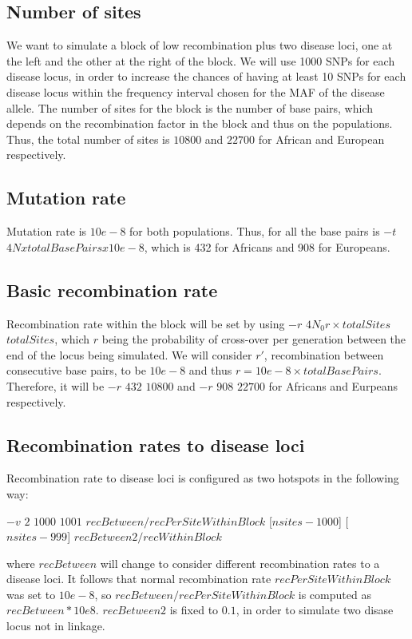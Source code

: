 \documentclass[runningheads]{/home/mabad/conferences/LNCS/llncs}
\begin{document}
\subsection{Number of sites}
We want to simulate a block of low recombination plus two disease loci, one at the left and the other at the right of the block. 
We will use 1000 SNPs for each disease locus, in order to increase the chances of having at least 10 SNPs for each disease locus within the frequency interval chosen for the MAF of the disease allele.
The number of sites for the block is the number of base pairs, which depends on the recombination factor in the block and thus on the populations. Thus, the total number of sites is $10800$ and $22700$ for African and European respectively. 

\subsection{Mutation rate}

Mutation rate is $10e-8$ for both populations. Thus, for all the base pairs is $-t$ $4NxtotalBasePairsx10e-8$, which is  432 for Africans and 908 for Europeans. 

\subsection{Basic recombination rate}
Recombination rate within the block will be set by using $-r$ $4N_0r\times totalSites$ $totalSites$, which $r$ being the probability of cross-over per generation between the end of the locus being simulated. We will consider $r'$, recombination between consecutive base pairs, to be $10e-8$ and thus $r=10e-8 \times totalBasePairs$. Therefore, it will be $-r$  $432$ $10800$ and $-r$ $908$ $22700$ for Africans and Eurpeans respectively.

\subsection{Recombination rates to disease loci}
Recombination rate to disease loci is configured as two hotspots in the following
way:

$-v$ $2$  $1000$ $1001$ $recBetween/recPerSiteWithinBlock$ [$nsites-1000$] [$nsites-999$] $recBetween2/recWithinBlock$


where $recBetween$ will change to consider different recombination rates to a disease loci. 
It follows that normal recombination rate $recPerSiteWithinBlock$ was set to $10e-8$, so $recBetween/recPerSiteWithinBlock$ is computed as $recBetween*10e8$. $recBetween2$ is fixed to $0.1$, in order to simulate two disase locus not in linkage.
\end{document}
